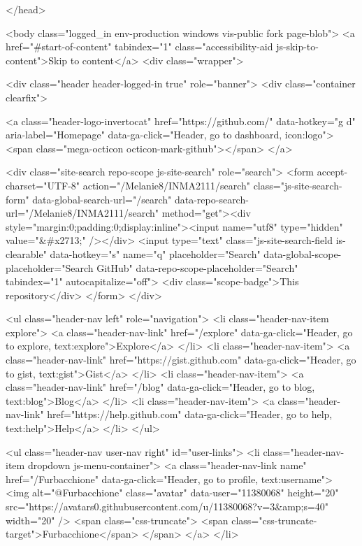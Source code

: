   </head>


  <body class="logged_in  env-production windows vis-public fork page-blob">
    <a href="#start-of-content" tabindex="1" class="accessibility-aid js-skip-to-content">Skip to content</a>
    <div class="wrapper">
      
      
      


        <div class="header header-logged-in true" role="banner">
  <div class="container clearfix">

    <a class="header-logo-invertocat" href="https://github.com/" data-hotkey="g d" aria-label="Homepage" data-ga-click="Header, go to dashboard, icon:logo">
  <span class="mega-octicon octicon-mark-github"></span>
</a>


      <div class="site-search repo-scope js-site-search" role="search">
          <form accept-charset="UTF-8" action="/Melanie8/INMA2111/search" class="js-site-search-form" data-global-search-url="/search" data-repo-search-url="/Melanie8/INMA2111/search" method="get"><div style="margin:0;padding:0;display:inline"><input name="utf8" type="hidden" value="&#x2713;" /></div>
  <input type="text"
    class="js-site-search-field is-clearable"
    data-hotkey="s"
    name="q"
    placeholder="Search"
    data-global-scope-placeholder="Search GitHub"
    data-repo-scope-placeholder="Search"
    tabindex="1"
    autocapitalize="off">
  <div class="scope-badge">This repository</div>
</form>
      </div>

      <ul class="header-nav left" role="navigation">
          <li class="header-nav-item explore">
            <a class="header-nav-link" href="/explore" data-ga-click="Header, go to explore, text:explore">Explore</a>
          </li>
            <li class="header-nav-item">
              <a class="header-nav-link" href="https://gist.github.com" data-ga-click="Header, go to gist, text:gist">Gist</a>
            </li>
            <li class="header-nav-item">
              <a class="header-nav-link" href="/blog" data-ga-click="Header, go to blog, text:blog">Blog</a>
            </li>
          <li class="header-nav-item">
            <a class="header-nav-link" href="https://help.github.com" data-ga-click="Header, go to help, text:help">Help</a>
          </li>
      </ul>

      
<ul class="header-nav user-nav right" id="user-links">
  <li class="header-nav-item dropdown js-menu-container">
    <a class="header-nav-link name" href="/Furbacchione" data-ga-click="Header, go to profile, text:username">
      <img alt="@Furbacchione" class="avatar" data-user="11380068" height="20" src="https://avatars0.githubusercontent.com/u/11380068?v=3&amp;s=40" width="20" />
      <span class="css-truncate">
        <span class="css-truncate-target">Furbacchione</span>
      </span>
    </a>
  </li>

